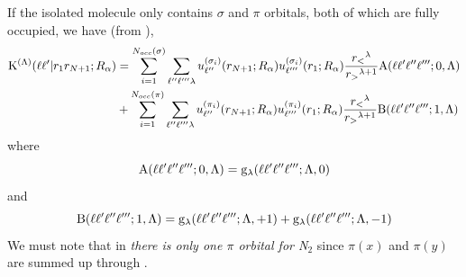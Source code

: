 \documentclass[aps,pra,groupedaddress,12pt,
               amsfonts,amssymb,
               preprint
    ]{revtex4}
\begin{document}
If the isolated molecule only contains $\sigma$ and $\pi$ orbitals, both
of which are fully occupied, we have (from ),
\begin{equation}
  \label{eq:KEXc}
  \begin{split}
  \vckexk & = \sum_{i=1}^{N_{occ}(\sigma)}\sum_{\ell''\ell'''\lambda}
  \orwbcsn\orwcbsn\dfrac{r_<{}^\lambda}{r_>{}^{\lambda+1}}\Ala \\
       & + \sum_{i=1}^{N_{occ}(\pi)}\sum_{\ell''\ell'''\lambda}
  \orwbcpn\orwcbpn\dfrac{r_<{}^\lambda}{r_>{}^{\lambda+1}}\Bla
  \end{split}
\end{equation}
where
\begin{equation}
  \label{eq:Ala}
  \Ala = \glas
\end{equation}
and 
\begin{equation}
  \label{eq:Bla}
  \Bla = \glabpa + \glabpb
\end{equation}
We must note that in  \textsl{there is only one $\pi$ orbital
  for N$_2$} since $\pi(x)$ and $\pi(y)$ are summed up through .
\end{document}
